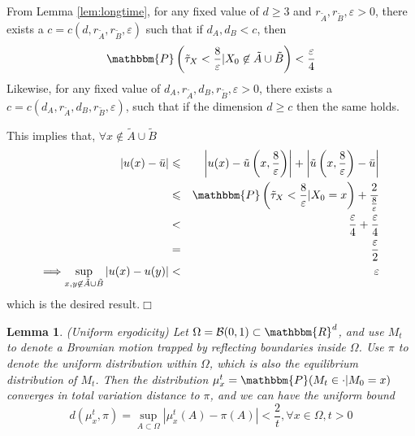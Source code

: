 \documentclass[english, aip, jcp, priprint, graphicx]{revtex4-1}
\newcommand{\nin}{\not\in}
\newtheorem{lemma}{Lemma}
\theoremstyle{plain}
\theoremstyle{definition}
\theoremstyle{plain}
\begin{document}
From Lemma \ref{lem:longtime}, for any fixed value of $d \geqslant 3$ and
$r_{\tilde{A}}, r_{\tilde{B}}, \varepsilon > 0$, there exists a $c = c (d,
r_{\tilde{A}}, r_{\tilde{B}}, \varepsilon)$ such that if $d_A, d_B < c$, then
\[ \mathbbm{P} \left( \tilde{\tau}_X < \frac{8}{\varepsilon} |X_0 \nin
\tilde{A} \cup \tilde{B} \right) < \frac{\varepsilon}{4} \]
Likewise, for any fixed value of $d_A, r_{\tilde{A}}, d_B, r_{\tilde{B}},
\varepsilon > 0$, there exists a $c = c (d_A, r_{\tilde{A}}, d_B,
r_{\tilde{B}}, \varepsilon)$, such that if the dimension $d \geqslant c$ then
the same holds.

This implies that, $\forall x \nin \tilde{A} \cup \tilde{B}$
\begin{eqnarray*}
| u (x) - \bar{u} | & \leqslant & \left| u (x) - \tilde{u} \left( x,
\frac{8}{\varepsilon} \right) \right| + \left| \tilde{u} \left( x,
\frac{8}{\varepsilon} \right) - \bar{u} \right|\\
& \leqslant & \mathbbm{P} \left( \tilde{\tau}_X < \frac{8}{\varepsilon}
|X_0 = x \right) + \frac{2}{\frac{8}{\varepsilon}}\\
& < & \frac{\varepsilon}{4} + \frac{\varepsilon}{4}\\
& = & \frac{\varepsilon}{2}\\
\Longrightarrow \sup_{x, y \nin \tilde{A} \cup \tilde{B}} | u (x) - u (y) |
& < & \varepsilon
\end{eqnarray*}
which is the desired result.\hspace*{\fill}$\Box$\medskip

\begin{lemma}
\label{lem:uniform_ergodicity}(Uniform ergodicity) Let $\Omega = \mathcal{B}
(0, 1) \subset \mathbbm{R}^d$, and use $M_t$ to denote a Brownian motion
trapped by reflecting boundaries inside $\Omega$. Use $\pi$ to denote the
uniform distribution within $\Omega$, which is also the equilibrium
distribution of $M_t$. Then the distribution $\mu_x^t =\mathbbm{P} (M_t \in
\cdot |M_0 = x)$ converges in total variation distance to $\pi$, and we can
have the uniform bound
\[ d (\mu_x^t, \pi) = \sup_{A \subset \Omega} | \mu_x^t (A) - \pi (A) | <
\frac{2}{t}, \forall x \in \Omega, t > 0 \]
\end{lemma}
\end{document}
